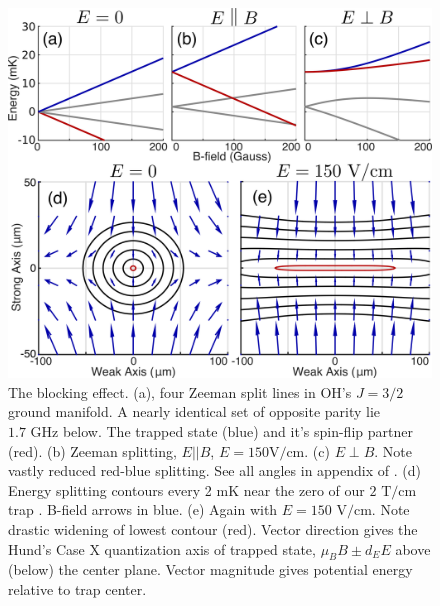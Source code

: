 \documentclass[%
 reprint,
 amsmath,amssymb,
 aps,
prl,
]{revtex4-1}
\begin{document}
\begin{figure}[tb]
\includegraphics[width=\linewidth]{Blocking/blocking.png}%
\caption{
The blocking effect. (a), four Zeeman split lines in OH's $J=3/2$ ground manifold. A nearly identical set of opposite parity lie $1.7\text{ GHz}$ below. The trapped state (blue) and it's spin-flip partner (red). (b) Zeeman splitting, $E||B$, $E=150\text{V/cm}$. (c) $E\!\perp\!B$. Note vastly reduced red-blue splitting. See all angles in appendix of \cite{Stuhl2013}. (d) Energy splitting contours every 2 mK near the zero of our $2\text{ T/cm}$ trap \cite{Stuhl2012uwave}. B-field arrows in blue. (e) Again with $E=150\text{ V/cm}$. Note drastic widening of lowest contour (red). Vector direction gives the Hund's Case X quantization axis of trapped state, $\mu_BB\pm d_EE$ above (below) the center plane. Vector magnitude gives potential energy relative to trap center.
\label{fig:blocking}}
\end{figure}

\end{document}
